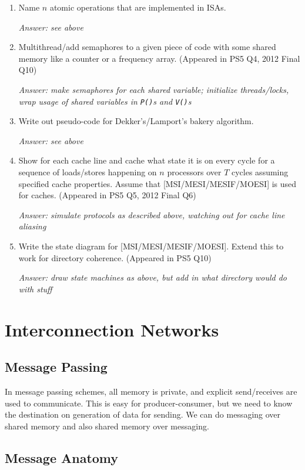 \documentclass{article}
\begin{document}
\begin{enumerate}
\item Name $n$ atomic operations that are implemented in ISAs.

\textit{Answer: see above}

\item Multithread/add semaphores to a given piece of code with some shared memory like a counter or a frequency array. (Appeared in PS5 Q4, 2012 Final Q10)

\textit{Answer: make semaphores for each shared variable; initialize threads/locks, wrap usage of shared variables in \texttt{P()}s and \texttt{V()}s}

\item Write out pseudo-code for Dekker's/Lamport's bakery algorithm.

\textit{Answer: see above}

\item Show for each cache line and cache what state it is on every cycle for a sequence of loads/stores happening on $n$ processors over $T$ cycles assuming specified cache properties. Assume that [MSI/MESI/MESIF/MOESI] is used for caches. (Appeared in PS5 Q5, 2012 Final Q6)

\textit{Answer: simulate protocols as described above, watching out for cache line aliasing}

\item Write the state diagram for [MSI/MESI/MESIF/MOESI]. Extend this to work for directory coherence. (Appeared in PS5 Q10)

\textit{Answer: draw state machines as above, but add in what directory would do with stuff}

\end{enumerate}

\section{Interconnection Networks}

\subsection{Message Passing}

In message passing schemes, all memory is private, and explicit send/receives are used to communicate. This is easy for producer-consumer, but we need to know the destination on generation of data for sending. We can do messaging over shared memory and also shared memory over messaging.

\subsection{Message Anatomy}
\end{document}

